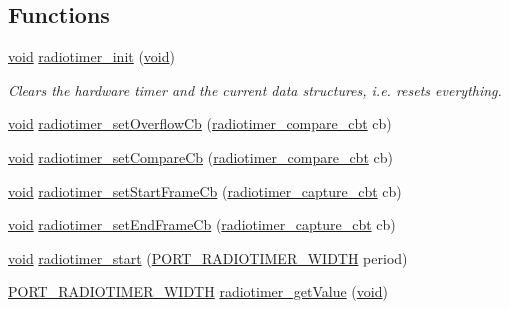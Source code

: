 \subsection*{Functions}
\begin{DoxyCompactItemize}
\item 
\hyperlink{usb__devapi_8h_afabf60e7f57651d6d595a02c75f07cd0}{void} \hyperlink{group__radiotimer_ga9a5ab332f81d5e2a74143ad62ef6a2f7}{radiotimer\+\_\+init} (\hyperlink{usb__devapi_8h_afabf60e7f57651d6d595a02c75f07cd0}{void})
\begin{DoxyCompactList}\small\item\em Clears the hardware timer and the current data structures, i.\+e. resets everything. \end{DoxyCompactList}\item 
\hyperlink{usb__devapi_8h_afabf60e7f57651d6d595a02c75f07cd0}{void} \hyperlink{group__radiotimer_gab892e556a83f22551ff4e4551bd488f7}{radiotimer\+\_\+set\+Overflow\+Cb} (\hyperlink{group__radiotimer_ga62b602325e65023c91b784f20cd2d6bc}{radiotimer\+\_\+compare\+\_\+cbt} cb)
\item 
\hyperlink{usb__devapi_8h_afabf60e7f57651d6d595a02c75f07cd0}{void} \hyperlink{group__radiotimer_gaf4d7c5df5b6c28462c5104df496ae584}{radiotimer\+\_\+set\+Compare\+Cb} (\hyperlink{group__radiotimer_ga62b602325e65023c91b784f20cd2d6bc}{radiotimer\+\_\+compare\+\_\+cbt} cb)
\item 
\hyperlink{usb__devapi_8h_afabf60e7f57651d6d595a02c75f07cd0}{void} \hyperlink{group__radiotimer_gad6bae4a356aa6856a48dd247eea43f84}{radiotimer\+\_\+set\+Start\+Frame\+Cb} (\hyperlink{group__radiotimer_gac7da641d0774aa21bfabefd560e42acf}{radiotimer\+\_\+capture\+\_\+cbt} cb)
\item 
\hyperlink{usb__devapi_8h_afabf60e7f57651d6d595a02c75f07cd0}{void} \hyperlink{group__radiotimer_ga54531cf0f173f07f760d24aeacbc6fe3}{radiotimer\+\_\+set\+End\+Frame\+Cb} (\hyperlink{group__radiotimer_gac7da641d0774aa21bfabefd560e42acf}{radiotimer\+\_\+capture\+\_\+cbt} cb)
\item 
\hyperlink{usb__devapi_8h_afabf60e7f57651d6d595a02c75f07cd0}{void} \hyperlink{group__radiotimer_ga5afd5ed18d32fb118dca4ea99d181e35}{radiotimer\+\_\+start} (\hyperlink{z1_2board__info_8h_ac16e02aadd749b2d27638bed1a805a59}{P\+O\+R\+T\+\_\+\+R\+A\+D\+I\+O\+T\+I\+M\+E\+R\+\_\+\+W\+I\+D\+TH} period)
\item 
\hyperlink{z1_2board__info_8h_ac16e02aadd749b2d27638bed1a805a59}{P\+O\+R\+T\+\_\+\+R\+A\+D\+I\+O\+T\+I\+M\+E\+R\+\_\+\+W\+I\+D\+TH} \hyperlink{group__radiotimer_ga763b0da72c3bbf926f5a74283de1003c}{radiotimer\+\_\+get\+Value} (\hyperlink{usb__devapi_8h_afabf60e7f57651d6d595a02c75f07cd0}{void})

\end{DoxyCompactItemize}
